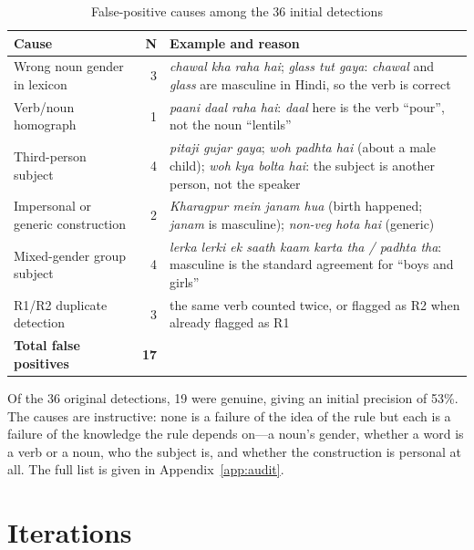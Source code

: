 \documentclass[11pt,a4paper]{report}
\begin{document}
\begin{table}[H]
\centering
\caption{False-positive causes among the 36 initial detections}
\label{tab:fp}
\small
\begin{tabularx}{\textwidth}{lrX}
\toprule
\textbf{Cause} & \textbf{N} & \textbf{Example and reason} \\
\midrule
Wrong noun gender in lexicon & 3 & \textit{chawal kha raha hai}; \textit{glass tut gaya}: \textit{chawal} and \textit{glass} are masculine in Hindi, so the verb is correct \\
Verb/noun homograph & 1 & \textit{paani daal raha hai}: \textit{daal} here is the verb ``pour'', not the noun ``lentils'' \\
Third-person subject & 4 & \textit{pitaji gujar gaya}; \textit{woh padhta hai} (about a male child); \textit{woh kya bolta hai}: the subject is another person, not the speaker \\
Impersonal or generic construction & 2 & \textit{Kharagpur mein janam hua} (birth happened; \textit{janam} is masculine); \textit{non-veg hota hai} (generic) \\
Mixed-gender group subject & 4 & \textit{lerka lerki ek saath kaam karta tha / padhta tha}: masculine is the standard agreement for ``boys and girls'' \\
R1/R2 duplicate detection & 3 & the same verb counted twice, or flagged as R2 when already flagged as R1 \\
\midrule
\textbf{Total false positives} & \textbf{17} & \\
\bottomrule
\end{tabularx}
\end{table}

Of the 36 original detections, 19 were genuine, giving an initial precision of 53\%. The causes are instructive: none is a failure of the idea of the rule but each is a failure of the knowledge the rule depends on---a noun's gender, whether a word is a verb or a noun, who the subject is, and whether the construction is personal at all. The full list is given in Appendix~\ref{app:audit}.

\section{Iterations}
\end{document}
